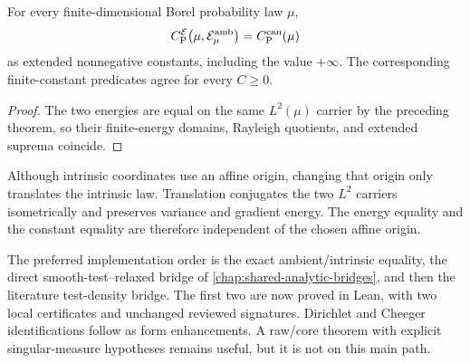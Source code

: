 \begin{corollary}
  \label{cor:ambient-intrinsic-constant-equality}
  \leanok
  For every finite-dimensional Borel probability law $\mu$,
  \[
    C_{\mathrm P}^{\mathcal E}\bigl(\mu,\mathcal E^{\mathrm{amb}}_\mu\bigr)=C_{\mathrm P}^{\mathrm{can}}(\mu)
  \]
  as extended nonnegative constants, including the value $+\infty$. The corresponding
  finite-constant predicates agree for every $C\ge0$.
\end{corollary}
\begin{proof}
  \leanok
   The two energies are equal on the same $L^2(\mu)$ carrier by the preceding theorem, so
  their finite-energy domains, Rayleigh quotients, and extended suprema coincide.
\end{proof}

Although intrinsic coordinates use an affine origin, changing that origin only translates the
intrinsic law.  Translation conjugates the two $L^2$ carriers isometrically and preserves
variance and gradient energy.  The energy equality and the constant equality are therefore
independent of the chosen affine origin.

The preferred implementation order is the exact ambient/intrinsic equality, the direct
smooth-test--relaxed bridge of \cref{chap:shared-analytic-bridges}, and then the literature test-density
bridge.  The first two are now proved in Lean, with two local certificates and unchanged reviewed signatures.
Dirichlet and Cheeger identifications follow as form enhancements.  A raw/core theorem
with explicit singular-measure hypotheses remains useful, but it is not on this main path.
